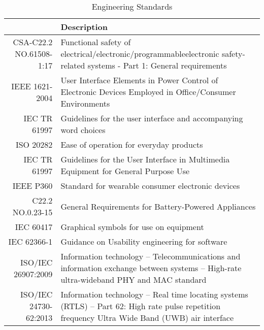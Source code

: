 \def\arraystretch{1.5}
\begin{table}[H]
\centering
\begin{tabular}{ | p{3.5cm} | p{11.5cm}| } 
\hline
\rowcolor{lightgray} \multicolumn{1}{|r|}{\textbf{Standard Code}} & \textbf{Description}\\ 
\hline
\multicolumn{1}{|r|}{CSA-C22.2 NO.61508-1:17} & Functional safety of electrical/electronic/programmableelectronic safety-related systems - Part 1: General requirements \cite{R10-5-1}\\ 
\hline
\multicolumn{1}{|r|}{IEEE 1621-2004} & User Interface Elements in Power Control of Electronic Devices Employed in Office/Consumer Environments \cite{R10-5-2}\\ 
\hline
\multicolumn{1}{|r|}{IEC TR 61997} & Guidelines for the user interface and accompanying word choices \cite{R10-5-3} \\ 
\hline
\multicolumn{1}{|r|}{ISO 20282} & Ease of operation for everyday products \cite{R10-5-4} \\ 
\hline
\multicolumn{1}{|r|}{IEC TR 61997} & Guidelines for the User Interface in Multimedia Equipment for General Purpose Use \cite{R10-5-5} \\ 
\hline
\multicolumn{1}{|r|}{IEEE P360} & Standard for wearable consumer electronic devices \cite{R10-5-6}\\ 
\hline
\multicolumn{1}{|r|}{C22.2 NO.0.23-15} & General Requirements for Battery-Powered Appliances \cite{R10-5-7}\\ 
\hline
\multicolumn{1}{|r|}{IEC 60417} & Graphical symbols for use on equipment \cite{R10-5-8}\\ 
\hline
\multicolumn{1}{|r|}{IEC 62366-1} & Guidance on Usability engineering for software \cite{R10-5-9}\\ 
\hline
\multicolumn{1}{|r|}{ISO/IEC 26907:2009} & Information technology -- Telecommunications and information exchange between systems -- High-rate ultra-wideband PHY and MAC standard \cite{R10-5-10} \\
\hline
\multicolumn{1}{|r|}{ISO/IEC 24730-62:2013} & Information technology -- Real time locating systems (RTLS) -- Part 62: High rate pulse repetition frequency Ultra Wide Band (UWB) air interface \cite{R10-5-11}\\ 
\hline
\end{tabular}
\caption{Engineering Standards}
\end{table}	









